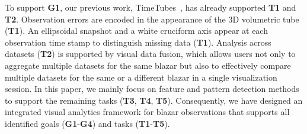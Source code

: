 To support \textbf{G1}, our previous work, TimeTubes~\cite{Fujishiro2018}, has already supported \textbf{T1} and \textbf{T2}.
Observation errors are encoded in the appearance of the 3D volumetric tube (\textbf{T1}).
An ellipsoidal snapshot and a white cruciform axis appear at each observation time stamp to distinguish missing data (\textbf{T1}).
Analysis across datasets (\textbf{T2}) is supported by visual data fusion, which allows users not only to aggregate multiple datasets for the same blazar but also to effectively compare multiple datasets for the same or a different blazar in a single visualization session.
In this paper, we mainly focus on feature and pattern detection methods to support the remaining tasks (\textbf{T3}, \textbf{T4}, \textbf{T5}).
Consequently, we have designed an integrated visual analytics framework for blazar observations that supports all identified goals (\textbf{G1}-\textbf{G4}) and tasks (\textbf{T1}-\textbf{T5}).



